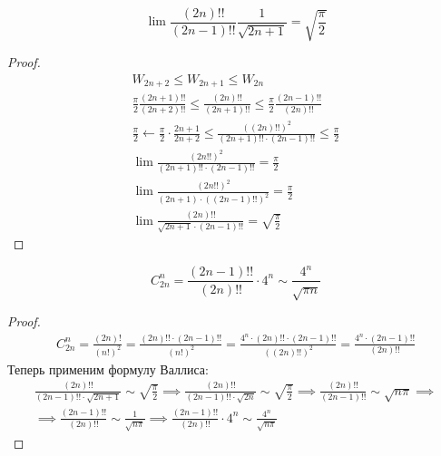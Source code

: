 \begin{theorem}
    \begin{equation*}
        \lim \frac{(2n)!!}{(2n - 1)!!}\frac{1}{\sqrt{2n + 1}} = \sqrt{\frac{\pi}{2}}
    \end{equation*}
\end{theorem}
\begin{proof}
  \begin{equation*}
    \begin{gathered}
      W_{2n + 2} \leq W_{2n + 1} \leq W_{2n} \\
      \frac{\pi}{2} \frac{(2n + 1)!!}{(2n + 2)!!} \leq \frac{(2n)!!}{(2n + 1)!!} \leq \frac{\pi}{2} \frac{(2n - 1)!!}{(2n)!!} \\
      \frac{\pi}{2} \leftarrow \frac{\pi}{2} \cdot \frac{2n + 1}{2n + 2} \leq \frac{((2n)!!)^2}{(2n + 1)!!\cdot(2n - 1)!!} \leq \frac{\pi}{2} \\
      \lim \frac{(2n!!)^2}{(2n + 1)!!\cdot(2n - 1)!!} = \frac{\pi}{2} \\
      \lim \frac{(2n!!)^2}{(2n + 1)\cdot((2n - 1)!!)^2} = \frac{\pi}{2} \\
      \lim \frac{(2n)!!}{\sqrt{2n + 1} \cdot (2n - 1)!!} = \sqrt{\frac{\pi}{2}}
    \end{gathered}
  \end{equation*}
\end{proof}

\begin{follow}
  \begin{equation*}
    C_{2n}^{n} = \frac{(2n - 1)!!}{(2n)!!} \cdot 4^n \sim \frac{4^n}{\sqrt{\pi n}}
  \end{equation*}
\end{follow}
\begin{proof}
  \begin{equation*}
    \begin{gathered}
      C_{2n}^{n} =
      \frac{(2n)!}{(n!)^2} =
      \frac{(2n)!! \cdot (2n - 1)!!}{(n!)^2} =
      \frac{4^n \cdot (2n)!! \cdot (2n - 1)!!}{((2n)!!)^2} =
      \frac{4^n \cdot (2n - 1)!!}{(2n)!!}
    \end{gathered}
  \end{equation*}
  Теперь применим формулу Валлиса:
  \begin{equation*}
    \begin{gathered}
        \frac{(2n)!!}{(2n - 1)!! \cdot \sqrt{2n + 1}} \sim \sqrt{\frac{\pi}{2}}
        \implies
        \frac{(2n)!!}{(2n - 1)!! \cdot \sqrt{2n}} \sim \sqrt{\frac{\pi}{2}}
        \implies
        \frac{(2n)!!}{(2n - 1)!!} \sim \sqrt{n\pi}
        \implies \\
        \implies
        \frac{(2n - 1)!!}{(2n)!!} \sim \frac{1}{\sqrt{n\pi}}
        \implies
        \frac{(2n - 1)!!}{(2n)!!} \cdot 4^n \sim \frac{4^n}{\sqrt{n\pi}}
    \end{gathered}
  \end{equation*}
\end{proof}


